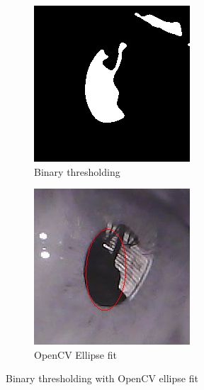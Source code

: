 \begin{figure}[h]
\begin{subfigure}{0.3\textwidth}
        \includegraphics[width=0.9\linewidth]{plots/results/roi_binary_ellipse.png}
        \caption{Binary thresholding}
    \end{subfigure}%
    \hfill
    \begin{subfigure}{0.3\textwidth}
        \centering
        \includegraphics[width=0.9\linewidth]{plots/results/roi_result_binary_ellipse.png}
        \caption{OpenCV Ellipse fit}
    \end{subfigure}%
    \caption{Binary thresholding with OpenCV ellipse fit}
    \label{fig:binary_threshold_ellipse_fit}
\end{figure}


